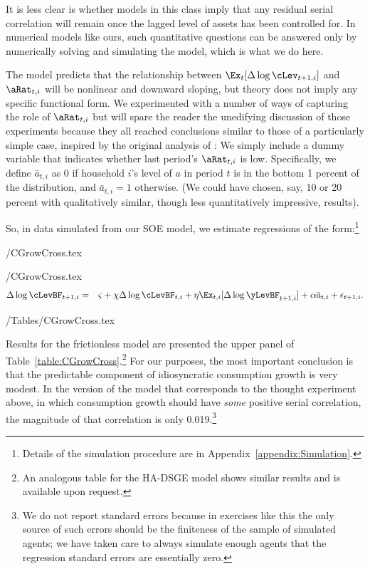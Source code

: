 \documentclass[titlepage]{\econtex}\newcommand{\texname}{cAndCwithStickyE}
\begin{document}
It is less clear is whether models in this class imply that any residual serial correlation will remain once the lagged level of assets has been controlled for.  In numerical models like ours, such quantitative questions can be answered only by numerically solving and simulating the model, which is what we do here.

The model predicts that the relationship between $\Ex_{t}[\Delta \log \cLev_{t+1,i}]$ and $\aRat_{t,i}$ will be nonlinear and downward sloping, but theory does not imply any specific functional form.  We experimented with a number of ways of capturing the role of $\aRat_{t,i}$ but will spare the reader the unedifying discussion of those experiments because they all reached conclusions similar to those of a particularly simple case, inspired by the original analysis of \cite{zeldes:jpe}: We simply include a dummy variable that indicates whether last period's $\aRat_{t,i}$ is low.  Specifically, we define $\bar{a}_{t,i}$ as 0 if household $i$'s level of ${a}$ in period $t$ is in the bottom 1 percent of the distribution, and $\bar{a}_{t,i}=1$ otherwise.  (We could have chosen, say, 10 or 20 percent with qualitatively similar, though less quantitatively impressive, results).

So, in data simulated from our SOE model, we estimate regressions of the form:\footnote{Details of the simulation procedure are in Appendix~\ref{appendix:Simulation}.}
\begin{verbatimwrite}{\eq/CGrowCross.tex}
   \newcommand{\CGrowCross}{\Delta \log       \cLevBF _{t+1,i}  &=&  \varsigma + \chi \Delta \log      \cLevBF _{t,i} + \eta     {\Ex}_{t,i}[\Delta \log       \yLevBF _{t+1,i}]+ {\alpha} \bar{a}_{t,i}+\epsilon_{t+1,i}.}
\newcommand{\CGrowCrossBar}{\Delta \log  \perc{\cLevBF}_{t+1,i}  &=&  \varsigma + \chi \Delta \log \perc{\cLevBF}_{t,i} + \eta     {\Ex}_{t,i}[\Delta \log \perc{\yLevBF}_{t+1,i}] + {\alpha} {\perc{a}}_{t,i}+\epsilon_{t+1,i}.}
\end{verbatimwrite}
 \eq/CGrowCross.tex
\begin{eqnarray}
\CGrowCross
\end{eqnarray}

\econtexRoot/Tables/CGrowCross.tex

Results for the frictionless model are presented the upper panel of Table~\ref{table:CGrowCross}.\footnote{An analogous table for the HA-DSGE model shows similar results and is available upon request.}  For our purposes, the most important conclusion is that the predictable component of idiosyncratic consumption growth is very modest.  In the version of the model that corresponds to the thought experiment above, in which consumption growth should have {\it some} positive serial correlation, the magnitude of that correlation is only 0.019.\footnote{We do not report standard errors because in exercises like this the only source of such errors should be the finiteness of the sample of simulated agents; we have taken care to always simulate enough agents that the regression standard errors are essentially zero.}
\end{document}
